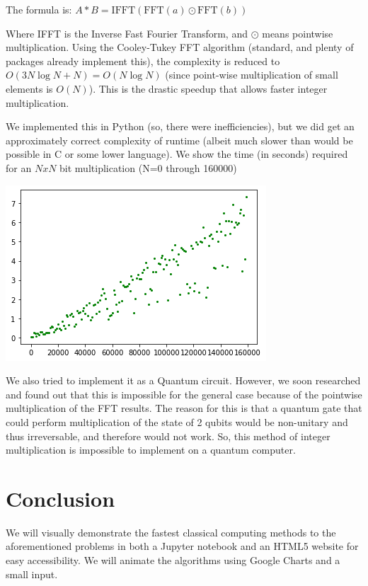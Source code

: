 \documentclass[a4paper,11pt]{article}
\theoremstyle{mytheor}
\begin{document}
The formula is: $A*B=\textrm{IFFT}(\textrm{FFT}(a) \odot \textrm{FFT}(b))$

Where IFFT is the Inverse Fast Fourier Transform, and $\odot$ means pointwise multiplication. Using the Cooley-Tukey FFT algorithm (standard, and plenty of packages already implement this), the complexity is reduced to $O(3N \log N + N) = O(N \log N)$ (since point-wise multiplication of small elements is $O(N)$). This is the drastic speedup that allows faster integer multiplication.

We implemented this in Python (so, there were inefficiencies), but we did get an approximately correct complexity of runtime (albeit much slower than would be possible in C or some lower language). We show the time (in seconds) required for an $NxN$ bit multiplication (N=0 through 160000)

\includegraphics{intMM_time}

We also tried to implement it as a Quantum circuit. However, we soon researched and found out that this is impossible for the general case \cite{qconv} because of the pointwise multiplication of the FFT results. The reason for this is that a quantum gate that could perform multiplication of the state of 2 qubits would be non-unitary and thus irreversable, and therefore would not work. So, this method of integer multiplication is impossible to implement on a quantum computer.


\section{Conclusion}
We will visually demonstrate the fastest classical computing methods to the aforementioned problems in both a Jupyter notebook and an HTML5 website for easy accessibility. We will animate the algorithms using Google Charts and a small input.
\end{document}
